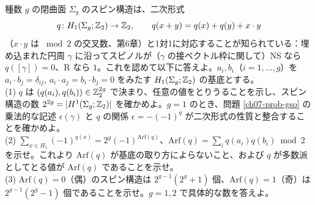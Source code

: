 \begin{problem}[難易度 D]\label{ch07-prob-arf}
種数 $g$ の閉曲面 $\Sigma_g$ のスピン構造は、二次形式
\[
q\colon H_1(\Sigma_g;\mathbb{Z}_2)\to\mathbb{Z}_2,\qquad q(x+y)=q(x)+q(y)+x\cdot y
\]
（$x\cdot y$ は $\bmod2$ の交叉数、第6章）と1対1に対応することが知られている：埋め込まれた円周 $\gamma$ に沿ってスピノルが（$\gamma$ の接ベクトル枠に関して）NS なら $q([\gamma])=0$、R なら $1$。これを認めて以下に答えよ。$a_i,b_i$（$i=1,\dots,g$）を $a_i\cdot b_j=\delta_{ij}$, $a_i\cdot a_j=b_i\cdot b_j=0$ をみたす $H_1(\Sigma_g;\mathbb{Z}_2)$ の基底とする。\\
(1) $q$ は $(q(a_i),q(b_i))\in\mathbb{Z}_2^{2g}$ で決まり、任意の値をとりうることを示し、スピン構造の数 $2^{2g}=\lvert H^1(\Sigma_g;\mathbb{Z}_2)\rvert$ を確かめよ。$g=1$ のとき、問題 \ref{ch07-prob-gso} の乗法的な記述 $\epsilon(\gamma)$ と $q$ の関係 $\epsilon=-(-1)^q$ が二次形式の性質と整合することを確かめよ。\\
(2) $\displaystyle\sum_{x\in H_1}(-1)^{q(x)}=2^g(-1)^{\mathrm{Arf}(q)}$、$\mathrm{Arf}(q)=\sum_iq(a_i)q(b_i)\bmod2$ を示せ。これより $\mathrm{Arf}(q)$ が基底の取り方によらないこと、および $q$ が多数派としてとる値が $\mathrm{Arf}(q)$ であることを示せ。\\
(3) $\mathrm{Arf}(q)=0$（偶）のスピン構造は $2^{g-1}(2^g+1)$ 個、$\mathrm{Arf}(q)=1$（奇）は $2^{g-1}(2^g-1)$ 個であることを示せ。$g=1,2$ で具体的な数を答えよ。
\end{problem}


